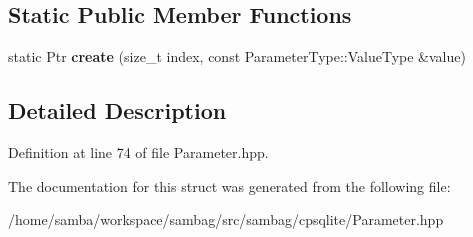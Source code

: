 \subsection*{Static Public Member Functions}
\begin{DoxyCompactItemize}
\item 
\hypertarget{structsambag_1_1cpsqlite_1_1_int_parameter_a18b8e8c4fbe84a4280eb22edfd20f4a9}{
static Ptr {\bfseries create} (size\_\-t index, const ParameterType::ValueType \&value)}
\label{structsambag_1_1cpsqlite_1_1_int_parameter_a18b8e8c4fbe84a4280eb22edfd20f4a9}

\end{DoxyCompactItemize}


\subsection{Detailed Description}


Definition at line 74 of file Parameter.hpp.



The documentation for this struct was generated from the following file:\begin{DoxyCompactItemize}
\item 
/home/samba/workspace/sambag/src/sambag/cpsqlite/Parameter.hpp\end{DoxyCompactItemize}
